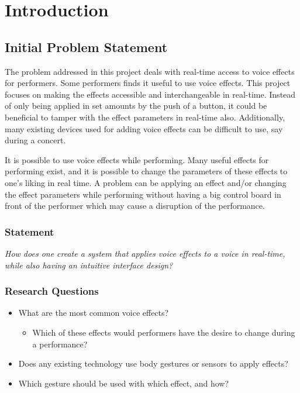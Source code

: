 \chapter{Introduction}\label{ch:Intro}

\section{Initial Problem Statement}

The problem addressed in this project deals with real-time access to voice effects for performers. 
Some performers finds it useful to use voice effects. This project focuses on making the effects accessible and interchangeable in real-time. Instead of only being applied in set amounts by the push of a button, it could be beneficial to tamper with the effect parameters in real-time also.
Additionally, many existing devices used for adding voice effects can be difficult to use, say during a concert. 


It is possible to use voice effects while performing. Many useful effects for performing exist, and it is possible to change the parameters of these effects to one's liking in real time. 
A problem can be applying an effect and/or changing the effect parameters while performing without having a big control board in front of the performer which may cause a disruption of the performance.


\subsection{Statement}

\textit{How does one create a system that applies voice effects to a voice in real-time, while also having an intuitive interface design?}


\subsection{Research Questions}\label{sub:ResearchQ}

\begin{itemize}
	\item What are the most common voice effects?
	\begin{itemize}
		\item Which of these effects would performers have the desire to change during a performance?
	\end{itemize}
	\item Does any existing technology use body gestures or sensors to apply effects?
	\item Which gesture should be used with which effect, and how?
\end{itemize}

